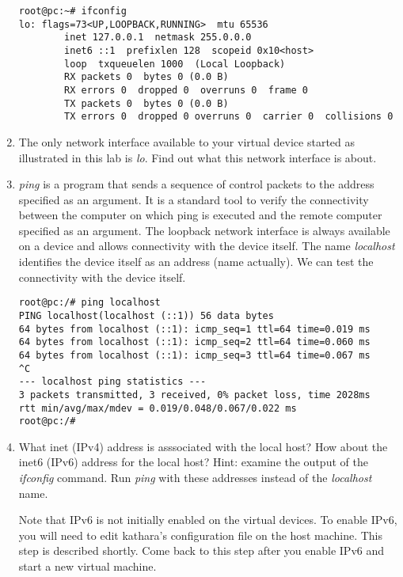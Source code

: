 \documentclass[12pt]{book}
\begin{document}
\begin{enumerate}[label=Activity \arabic*:]
\begin{lstlisting}
root@pc:~# ifconfig
lo: flags=73<UP,LOOPBACK,RUNNING>  mtu 65536
        inet 127.0.0.1  netmask 255.0.0.0
        inet6 ::1  prefixlen 128  scopeid 0x10<host>
        loop  txqueuelen 1000  (Local Loopback)
        RX packets 0  bytes 0 (0.0 B)
        RX errors 0  dropped 0  overruns 0  frame 0
        TX packets 0  bytes 0 (0.0 B)
        TX errors 0  dropped 0 overruns 0  carrier 0  collisions 0
\end{lstlisting}

\item The only network interface available to your virtual device started as illustrated in this lab is \emph{lo}. Find out what this network interface is about.

\item \emph{ping} is a program that sends a sequence of control packets to the address specified as an argument. It is a standard tool to verify the connectivity between the computer on which ping is executed and the remote computer specified as an argument. The loopback network interface is always available on a device and allows connectivity with the device itself. The name \emph{localhost} identifies the device itself as an address (name actually). We can test the connectivity with the device itself.

\begin{lstlisting}
root@pc:/# ping localhost
PING localhost(localhost (::1)) 56 data bytes
64 bytes from localhost (::1): icmp_seq=1 ttl=64 time=0.019 ms
64 bytes from localhost (::1): icmp_seq=2 ttl=64 time=0.060 ms
64 bytes from localhost (::1): icmp_seq=3 ttl=64 time=0.067 ms
^C
--- localhost ping statistics ---
3 packets transmitted, 3 received, 0% packet loss, time 2028ms
rtt min/avg/max/mdev = 0.019/0.048/0.067/0.022 ms
root@pc:/# 
\end{lstlisting}

\item What inet (IPv4) address is asssociated with the local host? How about the inet6 (IPv6) address for the local host? Hint: examine the output of the \emph{ifconfig} command. Run \emph{ping} with these addresses instead of the \emph{localhost} name.

  Note that IPv6 is not initially enabled on the virtual devices. To enable IPv6, you will need to edit kathara's configuration file on the host machine. This step is described shortly. Come back to this step after you enable IPv6 and start a new virtual machine.


\end{enumerate}
\end{document}
